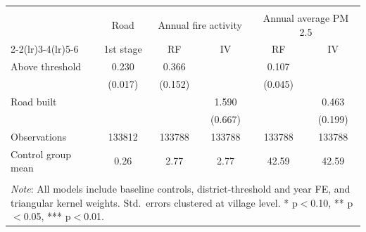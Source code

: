 \begin{tabular}{l*{5}{c}} 
\\[-1.8ex]\hline \hline \\[-1.8ex]
                    &\multicolumn{1}{c}{Road}&\multicolumn{2}{c}{Annual fire activity}   &\multicolumn{2}{c}{Annual average PM 2.5}  \\\cmidrule(lr){2-2}\cmidrule(lr){3-4}\cmidrule(lr){5-6}
                    &\multicolumn{1}{c}{1st stage}&\multicolumn{1}{c}{RF}&\multicolumn{1}{c}{IV}&\multicolumn{1}{c}{RF}&\multicolumn{1}{c}{IV}\\
\midrule
Above threshold     &       0.230\sym{***}&       0.366\sym{**} &                     &       0.107\sym{**} &                     \\
                    &     (0.017)         &     (0.152)         &                     &     (0.045)         &                     \\
Road built          &                     &                     &       1.590\sym{**} &                     &       0.463\sym{**} \\
                    &                     &                     &     (0.667)         &                     &     (0.199)         \\
\midrule
Observations        &      133812         &      133788         &      133788         &      133788         &      133788         \\
Control group mean  &        0.26         &        2.77         &        2.77         &       42.59         &       42.59         \\
\hline \hline \\[-1.8ex] 
\multicolumn{6}{p{\linewidth}}{\small 
\noindent \textit{Note}: All models 
include baseline controls, 
district-threshold and year FE, and 
triangular kernel weights. Std.\ errors 
clustered at village level. 
* p$<$0.10, ** p$<$0.05, 
*** p$<$0.01.} 
\end{tabular}
